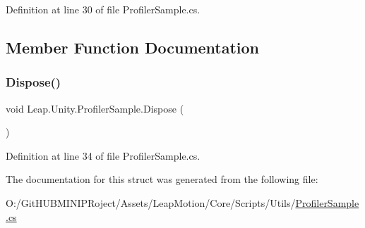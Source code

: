 Definition at line 30 of file Profiler\+Sample.\+cs.



\subsection{Member Function Documentation}
\mbox{\label{struct_leap_1_1_unity_1_1_profiler_sample_ad490a07e58eeb06e517e63389dbd2d41}} 
\subsubsection{\texorpdfstring{Dispose()}{Dispose()}}
{\footnotesize\ttfamily void Leap.\+Unity.\+Profiler\+Sample.\+Dispose (\begin{DoxyParamCaption}{ }\end{DoxyParamCaption})}



Definition at line 34 of file Profiler\+Sample.\+cs.



The documentation for this struct was generated from the following file\+:\begin{DoxyCompactItemize}
\item 
O\+:/\+Git\+H\+U\+B\+M\+I\+N\+I\+P\+Roject/\+Assets/\+Leap\+Motion/\+Core/\+Scripts/\+Utils/\mbox{\hyperlink{_profiler_sample_8cs}{Profiler\+Sample.\+cs}}\end{DoxyCompactItemize}
